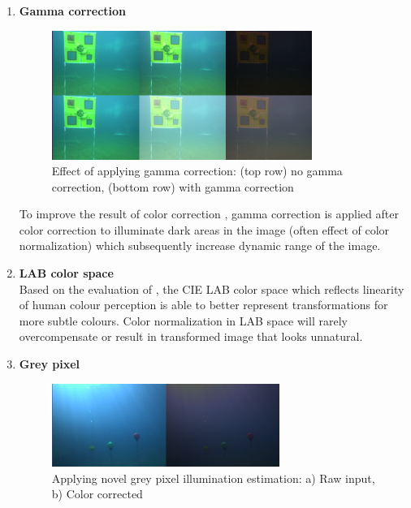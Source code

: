 \documentclass[hyp]{socreport}
\begin{document}
\begin{enumerate}

\item \textbf{Gamma correction} \\

\begin{figure}[H]
\centering
  \includegraphics[width=0.8\textwidth, height=0.3\textheight]{color_gamma.png}
  \caption{Effect of applying gamma correction: (top row) no gamma correction,
    (bottom row) with gamma correction}
  \label{fig:color_gamma}
\end{figure}

To improve the result of color correction , gamma
correction is applied after color correction to illuminate dark areas in the
image (often effect of color normalization) which subsequently increase dynamic
range of the image.

\item \textbf{LAB color space} \\
Based on the evaluation of , the CIE LAB color space
which reflects linearity of human colour perception is able to better represent
transformations for more subtle colours. Color normalization in LAB space will
rarely overcompensate or result in transformed image that looks unnatural.

\item \textbf{Grey pixel} \\

\begin{figure}[H]
\centering
  \includegraphics[width=0.7\textwidth, height=0.2\textheight]{greypixel.png}
  \caption{Applying novel grey pixel illumination estimation: a) Raw input, b)
    Color corrected}
  \label{fig:grey_pixel}
\end{figure}


\end{enumerate}
\end{document}
